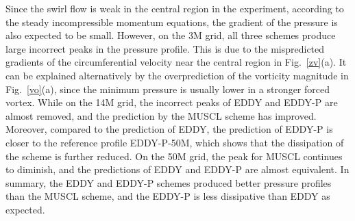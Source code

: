 Since the swirl flow is weak in the central region in the experiment, according to the steady incompressible momentum equations, the gradient of the pressure is also expected to be small. However, on the 3M grid, all three schemes produce large incorrect peaks in the pressure profile. This is due to the mispredicted gradients of the circumferential velocity near the central region in Fig.~\ref{zv}(a). It can be explained alternatively by the overprediction of the vorticity magnitude in Fig.~\ref{vo}(a), since the minimum pressure is usually lower in a stronger forced vortex. While on the 14M grid, the incorrect peaks of EDDY and EDDY-P are almost removed, and the prediction by the MUSCL scheme has improved. Moreover, compared to the prediction of EDDY, the prediction of EDDY-P is closer to the reference profile EDDY-P-50M, which shows that the dissipation of the scheme is further reduced. On the 50M grid, the peak for MUSCL continues to diminish, and the predictions of EDDY and EDDY-P are almost equivalent. In summary, the EDDY and EDDY-P schemes produced better pressure profiles than the MUSCL scheme, and the EDDY-P is less dissipative than EDDY as expected. 
